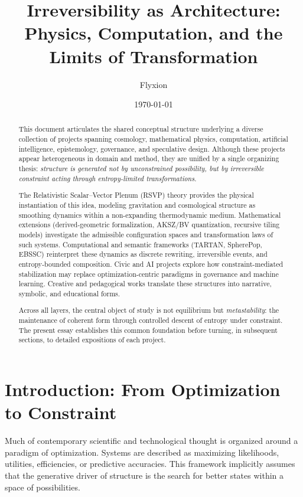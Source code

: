 \documentclass[12pt]{article}
\title{Irreversibility as Architecture:\\
Physics, Computation, and the Limits of Transformation}
\author{Flyxion}
\date{\today}
\begin{document}
\maketitle

\begin{abstract}

This document articulates the shared conceptual structure underlying a diverse collection of projects spanning cosmology, mathematical physics, computation, artificial intelligence, epistemology, governance, and speculative design. Although these projects appear heterogeneous in domain and method, they are unified by a single organizing thesis: \emph{structure is generated not by unconstrained possibility, but by irreversible constraint acting through entropy-limited transformations}.

The Relativistic Scalar--Vector Plenum (RSVP) theory provides the physical instantiation of this idea, modeling gravitation and cosmological structure as smoothing dynamics within a non-expanding thermodynamic medium. Mathematical extensions (derived-geometric formalization, AKSZ/BV quantization, recursive tiling models) investigate the admissible configuration spaces and transformation laws of such systems. Computational and semantic frameworks (TARTAN, SpherePop, EBSSC) reinterpret these dynamics as discrete rewriting, irreversible events, and entropy-bounded composition. Civic and AI projects explore how constraint-mediated stabilization may replace optimization-centric paradigms in governance and machine learning. Creative and pedagogical works translate these structures into narrative, symbolic, and educational forms.

Across all layers, the central object of study is not equilibrium but \emph{metastability}: the maintenance of coherent form through controlled descent of entropy under constraint. The present essay establishes this common foundation before turning, in subsequent sections, to detailed expositions of each project.

\end{abstract}

\newpage
\section{Introduction: From Optimization to Constraint}

Much of contemporary scientific and technological thought is organized around a paradigm of optimization. Systems are described as maximizing likelihoods, utilities, efficiencies, or predictive accuracies. This framework implicitly assumes that the generative driver of structure is the search for better states within a space of possibilities.
\end{document}
